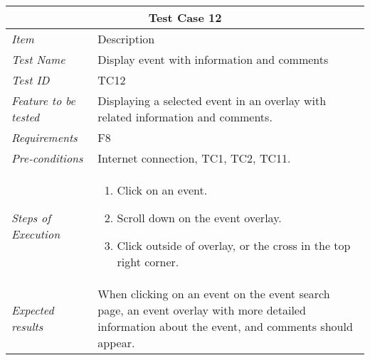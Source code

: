 %
\begin{minipage}{\linewidth}
\setlength{\tabcolsep}{15pt}
\centering
{}
\begin{tabular}{ |l|p{70mm}| }
	\hline
	\multicolumn{2}{|c|}{\cellcolor{gray!25} \textbf{Test Case 12}} \\
	\hline
	\it{\cellcolor{gray!25}Item} & {\cellcolor{gray!25} Description } \\
	\hline
	\it{\cellcolor{gray!25}Test Name } & Display event with information and comments \\ \hline
	\it{\cellcolor{gray!25}Test ID} & TC12 \\ \hline
	\it{\cellcolor{gray!25}Feature to be tested} & Displaying a selected event in an overlay with related information and comments. \\ \hline
	\it{\cellcolor{gray!25}Requirements} & F8  \\ \hline
	\it{\cellcolor{gray!25}Pre-conditions} & Internet connection, TC1, TC2, TC11. \\ \hline
	\it{\cellcolor{gray!25}Steps of Execution} & \begin{enumerate}
	                                       \item Click on an event.
	                                       \item Scroll down on the event overlay.
	                                       \item Click outside of overlay, or the cross in the top right corner.
	                                     \end{enumerate} \\ \hline
	\it{\cellcolor{gray!25}Expected results} & When clicking on an event  on the event search page, an event overlay with more detailed information about the event, and comments should appear.  \\
	\hline
\end{tabular}
\medskip
\end{minipage}
%

